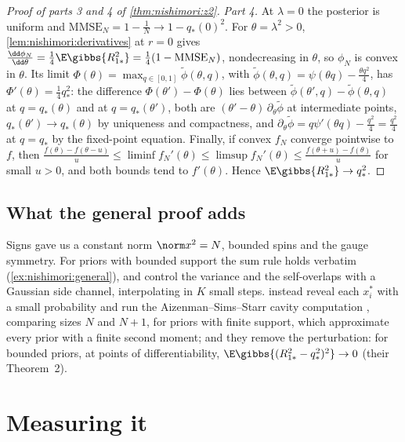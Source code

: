 \begin{refsection}
\begin{proof}[Proof of parts 3 and 4 of \cref{thm:nishimori:z2}]
\emph{Part 4.} At $\lambda=0$ the posterior is uniform and $\mathrm{MMSE}_N=1-\frac1N\to1-q_*(0)^2$. For $\theta=\lambda^2>0$, \cref{lem:nishimori:derivatives} at $r=0$ gives $\frac{\dd\phi_N}{\dd\theta}=\frac14\E\gibbs{R_{1*}^2}=\frac14(1-\mathrm{MMSE}_N)$, nondecreasing in $\theta$, so $\phi_N$ is convex in $\theta$. Its limit $\Phi(\theta)=\max_{q\in[0,1]}\tilde\phi(\theta,q)$, with $\tilde\phi(\theta,q)=\psi(\theta q)-\frac{\theta q^2}4$, has $\Phi'(\theta)=\frac14q_*^2$: the difference $\Phi(\theta')-\Phi(\theta)$ lies between $\tilde\phi(\theta',q)-\tilde\phi(\theta,q)$ at $q=q_*(\theta)$ and at $q=q_*(\theta')$, both are $(\theta'-\theta)\,\partial_\theta\tilde\phi$ at intermediate points, $q_*(\theta')\to q_*(\theta)$ by uniqueness and compactness, and $\partial_\theta\tilde\phi=q\psi'(\theta q)-\frac{q^2}4=\frac{q^2}4$ at $q=q_*$ by the fixed-point equation. Finally, if convex $f_N$ converge pointwise to $f$, then $\frac{f(\theta)-f(\theta-u)}u\le\liminf f_N'(\theta)\le\limsup f_N'(\theta)\le\frac{f(\theta+u)-f(\theta)}u$ for small $u>0$, and both bounds tend to $f'(\theta)$. Hence $\E\gibbs{R_{1*}^2}\to q_*^2$.
\end{proof}

\subsection{What the general proof adds}

Signs gave us a constant norm $\norm x^2=N$, bounded spins and the gauge symmetry. For priors with bounded support the sum rule holds verbatim (\cref{ex:nishimori:general}), and \textcite{BarbierMacris2019} control the variance and the self-overlaps with a Gaussian side channel, interpolating in $K$ small steps. \Textcite{LelargeMiolane2019} instead reveal each $x^*_i$ with a small probability and run the Aizenman--Sims--Starr cavity computation \parencite{AizenmanSimsStarr2003}, comparing sizes $N$ and $N+1$, for priors with finite support, which approximate every prior with a finite second moment; and they remove the perturbation: for bounded priors, at points of differentiability, $\E\gibbs{(R_{1*}^2-q_*^2)^2}\to0$ (their Theorem~2).

\section{Measuring it}\label{sec:nishimori:measuring}


\end{refsection}
